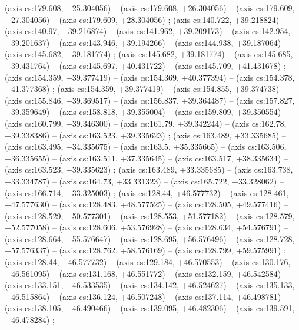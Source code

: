    (axis cs:179.608,    +25.304056) --  (axis cs:179.608,    +26.304056) --  (axis cs:179.609,    +27.304056) --  (axis cs:179.609,    +28.304056) ;
    (axis cs:140.722,    +39.218824) --  (axis cs:140.97,    +39.216874) --  (axis cs:141.962,    +39.209173) --  (axis cs:142.954,    +39.201637) --  (axis cs:143.946,    +39.194266) --  (axis cs:144.938,    +39.187064) --  (axis cs:145.682,    +39.181774) ;
    (axis cs:145.682,    +39.181774) --  (axis cs:145.685,    +39.431764) --  (axis cs:145.697,    +40.431722) --  (axis cs:145.709,    +41.431678) ;
    (axis cs:154.359,    +39.377419) --  (axis cs:154.369,    +40.377394) --  (axis cs:154.378,    +41.377368) ;
    (axis cs:154.359,    +39.377419) --  (axis cs:154.855,    +39.374738) --  (axis cs:155.846,    +39.369517) --  (axis cs:156.837,    +39.364487) --  (axis cs:157.827,    +39.359649) --  (axis cs:158.818,    +39.355004) --  (axis cs:159.809,    +39.350554) --  (axis cs:160.799,    +39.346300) --  (axis cs:161.79,    +39.342244) --  (axis cs:162.78,    +39.338386) --  (axis cs:163.523,    +39.335623) ;
    (axis cs:163.489,    +33.335685) --  (axis cs:163.495,    +34.335675) --  (axis cs:163.5,    +35.335665) --  (axis cs:163.506,    +36.335655) --  (axis cs:163.511,    +37.335645) --  (axis cs:163.517,    +38.335634) --  (axis cs:163.523,    +39.335623) ;
    (axis cs:163.489,    +33.335685) --  (axis cs:163.738,    +33.334787) --  (axis cs:164.73,    +33.331323) --  (axis cs:165.722,    +33.328062) --  (axis cs:166.714,    +33.325003) ;
    (axis cs:128.44,    +46.577732) --  (axis cs:128.461,    +47.577630) --  (axis cs:128.483,    +48.577525) --  (axis cs:128.505,    +49.577416) --  (axis cs:128.529,    +50.577301) --  (axis cs:128.553,    +51.577182) --  (axis cs:128.579,    +52.577058) --  (axis cs:128.606,    +53.576928) --  (axis cs:128.634,    +54.576791) --  (axis cs:128.664,    +55.576647) --  (axis cs:128.695,    +56.576496) --  (axis cs:128.728,    +57.576337) --  (axis cs:128.762,    +58.576169) --  (axis cs:128.799,    +59.575991) ;
    (axis cs:128.44,    +46.577732) --  (axis cs:129.184,    +46.570553) --  (axis cs:130.176,    +46.561095) --  (axis cs:131.168,    +46.551772) --  (axis cs:132.159,    +46.542584) --  (axis cs:133.151,    +46.533535) --  (axis cs:134.142,    +46.524627) --  (axis cs:135.133,    +46.515864) --  (axis cs:136.124,    +46.507248) --  (axis cs:137.114,    +46.498781) --  (axis cs:138.105,    +46.490466) --  (axis cs:139.095,    +46.482306) --  (axis cs:139.591,    +46.478284) ;
